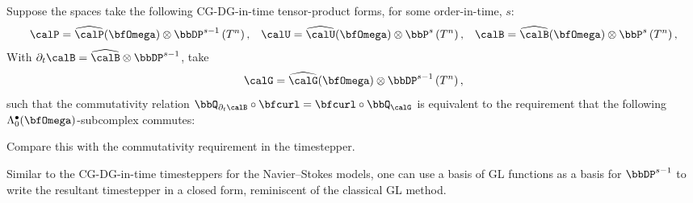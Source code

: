     \line

    \begin{example}
        Suppose the spaces take the following CG-DG-in-time tensor-product forms, for some order-in-time, $s$:
        \begin{align}
            \calP  =  \widehat{\calP}(\bfOmega)\otimes\bbDP^{s - 1}\left(T^{n}\right),  &&
            \calU  =  \widehat{\calU}(\bfOmega)\otimes\bbP^{s}\left(T^{n}\right),  &&
            \calB  =  \widehat{\calB}(\bfOmega)\otimes\bbP^{s}\left(T^{n}\right),
        \end{align}
        With $\partial_{t}\calB = \widehat{\calB}\otimes\bbDP^{s - 1}$, take
        \begin{equation}
            \calG  =  \widehat{\calG}(\bfOmega)\otimes\bbDP^{s - 1}\left(T^{n}\right),
        \end{equation}
        such that the commutativity relation $\bbQ_{\partial_{t}\calB}\circ\bfcurl = \bfcurl\circ\bbQ_{\calG}$ is equivalent to the requirement that the following $\Lambda_{0}^{\bullet}(\bfOmega)$-subcomplex commutes:
        \begin{center}\end{center}
        Compare this with the commutativity requirement in the \cite{Laakmann_Hu_Farrell_2022} timestepper.

        Similar to the CG-DG-in-time timesteppers for the Navier--Stokes models, one can use a basis of GL functions as a basis for $\bbDP^{s - 1}$ to write the resultant timestepper in a closed form, reminiscent of the classical GL method.


\end{example}
